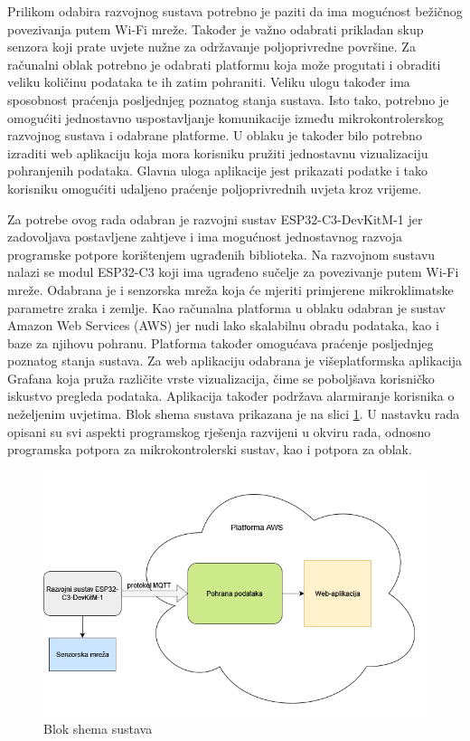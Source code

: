 Prilikom odabira razvojnog sustava potrebno je paziti da ima mogućnost bežičnog povezivanja putem Wi-Fi mreže. Također je važno odabrati prikladan skup senzora koji prate uvjete nužne za održavanje poljoprivredne površine. Za računalni oblak potrebno je odabrati platformu koja može progutati i obraditi veliku količinu podataka te ih zatim pohraniti. Veliku ulogu također ima sposobnost praćenja posljednjeg poznatog stanja sustava. Isto tako, potrebno je omogućiti jednostavno uspostavljanje komunikacije između mikrokontrolerskog razvojnog sustava i odabrane platforme. U oblaku je također bilo potrebno izraditi web aplikaciju koja mora korisniku pružiti jednostavnu vizualizaciju pohranjenih podataka. Glavna uloga aplikacije jest prikazati podatke i tako korisniku omogućiti udaljeno praćenje poljoprivrednih uvjeta kroz vrijeme. 

Za potrebe ovog rada odabran je razvojni sustav ESP32-C3-DevKitM-1 jer zadovoljava postavljene zahtjeve i ima mogućnost jednostavnog razvoja programske potpore korištenjem ugrađenih biblioteka. Na razvojnom sustavu nalazi se modul ESP32-C3 koji ima ugrađeno sučelje za povezivanje putem Wi-Fi mreže. Odabrana je i senzorska mreža koja će mjeriti primjerene mikroklimatske parametre zraka i zemlje. Kao računalna platforma u oblaku odabran je sustav Amazon Web Services (AWS) jer nudi lako skalabilnu obradu podataka, kao i baze za njihovu pohranu. Platforma također omogućava praćenje posljednjeg poznatog stanja sustava. Za web aplikaciju odabrana je višeplatformska aplikacija Grafana koja pruža različite vrste vizualizacija, čime se poboljšava korisničko iskustvo pregleda podataka. Aplikacija također podržava alarmiranje korisnika o neželjenim uvjetima. Blok shema sustava prikazana je na slici \ref{fig:shema}. U nastavku rada opisani su svi aspekti programskog rješenja razvijeni u okviru rada, odnosno programska potpora za mikrokontrolerski sustav, kao i potpora za oblak.

\begin{figure}[ht]
	\includegraphics[width=\linewidth]{imgs/shema}
	\caption{Blok shema sustava}
	\label{fig:shema}
\end{figure}

\eject
